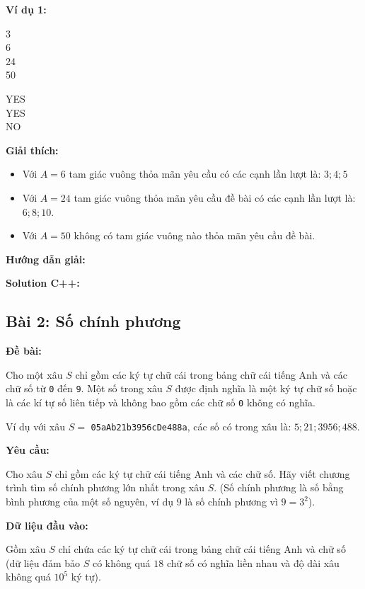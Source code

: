 \documentclass[12pt]{scrartcl}  %
\begin{document}
\textbf{Ví dụ 1:}
\begin{tcolorbox}[colback=gray!5!white, colframe=blue!50!black, title=Input]
3\\
6\\
24\\
50
\end{tcolorbox}
\begin{tcolorbox}[colback=gray!5!white, colframe=green!50!black, title=Output]
YES\\
YES\\
NO
\end{tcolorbox}

\textbf{Giải thích:}
\begin{itemize}
    \item Với $A = 6$ tam giác vuông thỏa mãn yêu cầu có các cạnh lần lượt là: $3;4;5$
    \item Với $A = 24$ tam giác vuông thỏa mãn yêu cầu đề bài có các cạnh lần lượt là: $6;8;10$.
    \item Với $A = 50$ không có tam giác vuông nào thỏa mãn yêu cầu đề bài.
\end{itemize}

\textbf{Hướng dẫn giải:}

\textbf{Solution C++:}

\subsection{Bài 2: Số chính phương}

\textbf{Đề bài:}

Cho một xâu $S$ chỉ gồm các ký tự chữ cái trong bảng chữ cái tiếng Anh và các chữ số từ \texttt{0} đến \texttt{9}. 
Một số trong xâu $S$ được định nghĩa là một ký tự chữ số hoặc là các kí tự số liên tiếp và không bao gồm các chữ số \texttt{0} không có nghĩa.

Ví dụ với xâu $S = $ \texttt{05aAb21b3956cDe488a}, các số có trong xâu là: $5; 21; 3956; 488$.

\textbf{Yêu cầu:}

Cho xâu $S$ chỉ gồm các ký tự chữ cái tiếng Anh và các chữ số. Hãy viết chương trình tìm số chính phương lớn nhất trong xâu $S$. (Số chính phương là số bằng bình phương của một số nguyên, ví dụ $9$ là số chính phương vì $9 = 3^2$).


\textbf{Dữ liệu đầu vào:}

Gồm xâu $S$ chỉ chứa các ký tự chữ cái trong bảng chữ cái tiếng Anh và chữ số (dữ liệu đảm bảo $S$ có không quá $18$ chữ số có nghĩa liền nhau và độ dài xâu không quá $10^5$ ký tự). 
\end{document}
